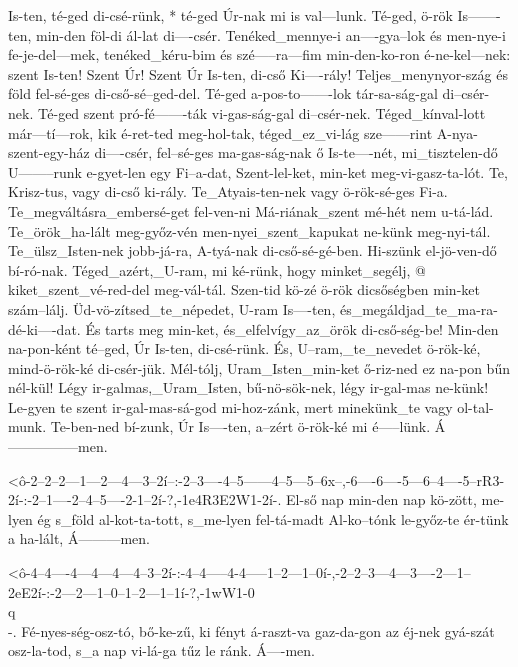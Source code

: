   {  Is-ten, té-ged di-csé-rünk, * té-ged Úr-nak mi is val---lunk. Té-ged, ö-rök Is-------ten, min-den föl-di ál-lat di----csér. Tenéked_mennye-i an----gya--lok és men-nye-i  fe-je-del---mek, tenéked_kéru-bim és szé-----ra---fim min-den-ko-ron é-ne-kel---nek: szent Is-ten! Szent Úr!  Szent Úr Is-ten, di-cső Ki----rály! Teljes_menynyor-szág és       föld fel-sé-ges di-cső-sé--ged-del. Té-ged a-pos-to-------lok tár-sa-ság-gal di--csér-nek. Té-ged szent pró-fé-------ták vi-gas-ság-gal di--csér-nek. Téged_kínval-lott már---tí---rok, kik é-ret-ted meg-hol-tak, téged_ez_vi-lág sze------rint A-nya-szent-egy-ház di----csér, fel--sé-ges ma-gas-ság-nak ő Is-te----nét, mi_tisztelen-dő U--------runk e-gyet-len egy Fi--a-dat, Szent-lel-ket, min-ket meg-vi-gasz-ta-lót. Te, Krisz-tus, vagy di-cső ki-rály. Te_Atyais-ten-nek   vagy ö-rök-sé-ges Fi-a.   Te_megváltásra_embersé-get fel-ven-ni  Má-riának_szent mé-hét nem u-tá-lád. Te_örök_ha-lált meg-győz-vén men-nyei_szent_kapukat ne-künk meg-nyi-tál. Te_ülsz_Isten-nek jobb-já-ra, A-tyá-nak di-cső-sé-gé-ben.   Hi-szünk el-jö-ven-dő bí-ró-nak. Téged_azért,_U-ram, mi ké-rünk, hogy minket_segélj, @  kiket_szent_vé-red-del meg-vál-tál. Szen-tid kö-zé  ö-rök dicsőségben min-ket szám--lálj. Üd-vö-zítsed_te_népedet, U-ram Is----ten, és_megáldjad_te_ma-ra-dé-ki----dat. És tarts meg min-ket, és_elfelvígy_az_örök di-cső-ség-be!  Min-den na-pon-ként té--ged,  Úr Is-ten, di-csé-rünk. És, U--ram,_te_nevedet ö-rök-ké, mind-ö-rök-ké di-csér-jük.  Mél-tólj, Uram_Isten_min-ket ő-riz-ned ez na-pon bűn nél-kül!  Légy ir-galmas,_Uram_Isten, bű-nö-sök-nek, légy ir-gal-mas ne-künk! Le-gyen te szent ir-gal-mas-sá-god mi-hoz-zánk, mert minekünk_te vagy ol-tal-munk. Te-ben-ned bí-zunk, Úr Is----ten, a--zért ö-rök-ké mi   é-----lünk. Á---------------men.}


  {<ô-2--2--2---1---2---4---3--2í--:-2--3----4--5------4--5---5--6x--,-6----6----5---6--4----5--rR3-2í-:-2--1----2--4--5----2-1--2í-?,-1e4R3E2W1-2í-.}
  {   El-ső nap min-den nap kö-zött, me-lyen ég s_föld al-kot-ta-tott, s_me-lyen fel-tá-madt Al-ko--tónk le-győz-te ér-tünk a ha-lált, Á---------men.}

  {<ô-4--4----4---4---4---4--3--2í-:-4--4-----4-4-----1--2---1--0í-,-2--2--3---4---3----2---1--2eE2í-:-2---2---1--0--1--2---1--1í-?,-1wW1-0\\q\\-.}
  {   Fé-nyes-ség-osz-tó, bő-ke-zű,  ki fényt á-raszt-va gaz-da-gon  az éj-nek gyá-szát osz-la-tod,    s_a nap vi-lá-ga tűz le ránk. Á----men.}

